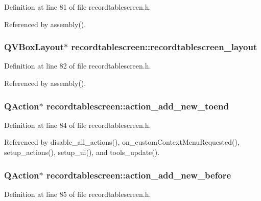 Definition at line 81 of file recordtablescreen.h.

Referenced by assembly().
\subsubsection{\setlength{\rightskip}{0pt plus 5cm}QVBox\-Layout$\ast$ {\bf recordtablescreen::recordtablescreen\_\-layout}\hspace{0.3cm}{\tt  [private]}}\label{classrecordtablescreen_7b65632d6fef4bd862e49ab1ec44846d}




Definition at line 82 of file recordtablescreen.h.

Referenced by assembly().
\subsubsection{\setlength{\rightskip}{0pt plus 5cm}QAction$\ast$ {\bf recordtablescreen::action\_\-add\_\-new\_\-toend}\hspace{0.3cm}{\tt  [private]}}\label{classrecordtablescreen_755c98554622673eb9f70c0dff10074b}




Definition at line 84 of file recordtablescreen.h.

Referenced by disable\_\-all\_\-actions(), on\_\-custom\-Context\-Menu\-Requested(), setup\_\-actions(), setup\_\-ui(), and tools\_\-update().
\subsubsection{\setlength{\rightskip}{0pt plus 5cm}QAction$\ast$ {\bf recordtablescreen::action\_\-add\_\-new\_\-before}\hspace{0.3cm}{\tt  [private]}}\label{classrecordtablescreen_6199377c78472f1c21b8ff6069f72c61}




Definition at line 85 of file recordtablescreen.h.


